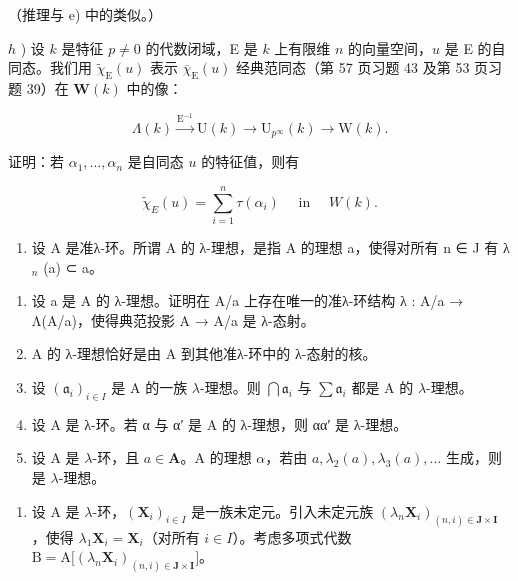 （推理与 e) 中的类似。）

\(h\) ) 设 \(k\) 是特征 \(p\ne0\) 的代数闭域，E 是 \(k\) 上有限维 \(n\) 的向量空间，\(u\) 是 E 的自同态。我们用 \(\tilde{\chi}_{\mathrm{E}}(u)\) 表示 \(\overline{\chi}_{\mathrm{E}}(u)\) 经典范同态（第 57 页习题 43 及第 53 页习题 39）在 \(\mathbf{W}(k)\) 中的像：

\[
\Lambda (k) \xrightarrow {\mathrm{E} ^ {- 1}} \mathrm{U} (k) \longrightarrow \mathrm{U} _ {p ^ {\infty}} (k) \longrightarrow \mathrm{W} (k).
\]

证明：若 \(\alpha_{1},\ldots,\alpha_{n}\) 是自同态 \(u\) 的特征值，则有

\[
\tilde {\chi} _ {E} (u) = \sum_ {i = 1} ^ {n} \tau (\alpha_ {i}) \quad \text { in } \quad W (k).
\]

\begin{enumerate}
\def\labelenumi{\arabic{enumi})}
\setcounter{enumi}{49}
\tightlist
\item
  设 A 是准λ-环。所谓 A 的 λ-理想，是指 A 的理想 a，使得对所有 n ∈ J 有 λ \(_{n}\) (a) ⊂ a。
\end{enumerate}

\begin{enumerate}
\def\labelenumi{\alph{enumi})}
\item
  设 a 是 A 的 λ-理想。证明在 A/a 上存在唯一的准λ-环结构 λ : A/a → Λ(A/a)，使得典范投影 A → A/a 是 λ-态射。
\item
  A 的 λ-理想恰好是由 A 到其他准λ-环中的 λ-态射的核。
\item
  设 \((\mathfrak{a}_i)_{i\in I}\) 是 A 的一族 \(\lambda\)-理想。则 \(\bigcap \mathfrak{a}_i\) 与 \(\sum \mathfrak{a}_i\) 都是 A 的 \(\lambda\)-理想。
\item
  设 A 是 λ-环。若 α 与 α′ 是 A 的 λ-理想，则 αα′ 是 λ-理想。
\item
  设 A 是 \(\lambda\)-环，且 \(a \in \mathbf{A}\)。A 的理想 \(\alpha\)，若由 \(a, \lambda_2(a), \lambda_3(a), \ldots\) 生成，则是 \(\lambda\)-理想。
\end{enumerate}

\begin{enumerate}
\def\labelenumi{\arabic{enumi})}
\setcounter{enumi}{50}
\tightlist
\item
  设 A 是 \(\lambda\)-环，\((\mathbf{X}_i)_{i\in I}\) 是一族未定元。引入未定元族 \((\lambda_n\mathbf{X}_i)_{(n,i)\in \mathbf{J}\times \mathbf{I}}\)，使得 \(\lambda_1\mathbf{X}_i = \mathbf{X}_i\)（对所有 \(i\in I\)）。考虑多项式代数 \(\mathrm{B} = \mathrm{A}\big[(\lambda_n\mathbf{X}_i)_{(n,i)\in \mathbf{J}\times \mathbf{I}}\big]\)。
\end{enumerate}

